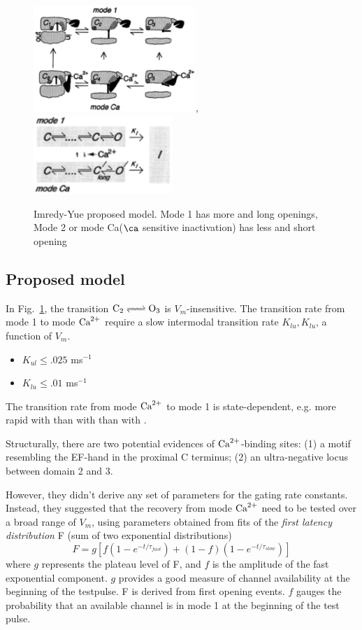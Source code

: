 \begin{figure}[hbt]
 \centerline{\includegraphics[height=4cm,
   angle=0]{./images/Imredy-Yue_mode.eps},
   \includegraphics[height=3cm, angle=0]{./images/Imredy-Yue_LCC.eps}}
 \caption{Imredy-Yue proposed model. Mode 1 has more and long
   openings, Mode 2 or mode Ca($\ca$ sensitive inactivation) has less
   and short opening}
\label{fig:Imredy-Yue}
\end{figure}

\subsection{Proposed model}

In Fig.~\ref{fig:Imredy-Yue}, the transition $\ce{C2 <=> O3}$ is
$V_m$-insensitive. The transition rate from mode 1 to mode ${\text{Ca}^{2+}}$ require
a slow intermodal transition rate $K_{lu}, K_{lu}$, a function of
$V_m$. 
\begin{itemize}
\item $K_{ul} \le .025$ ms$^{-1}$
\item $K_{lu} \le .01$ ms$^{-1}$
\end{itemize}
The transition rate from mode ${\text{Ca}^{2+}}$ to mode 1 is state-dependent,
e.g. more rapid with  than with  than with .

\begin{framed}
  
  Structurally, there are two potential evidences of
  ${\text{Ca}^{2+}}$-binding sites: (1) a motif resembling the EF-hand in the
  proximal C terminus; (2) an ultra-negative locus between domain 2
  and 3.
\end{framed}

However, they didn't derive any set of parameters for the gating rate constants.
Instead, they suggested that the recovery from mode ${\text{Ca}^{2+}}$ need to be tested over
a broad range of $V_m$, using parameters obtained from fits of the {\it first
latency distribution} F (sum of two exponential distributions)
\begin{equation}
  \label{eq:866}
  F = g \left[ f(1-e^{-t/\tau_{fast}}) + (1-f) (1-e^{-t/\tau_{slow}}) \right]
\end{equation}
where $g$ represents the plateau level of F, and $f$ is the amplitude
of the fast exponential component. $g$ provides a good measure of channel
availability at the beginning of the testpulse. F is derived from first opening
events. $f$ gauges the probability that an available channel is in mode 1 at the
beginning of the test pulse. 

